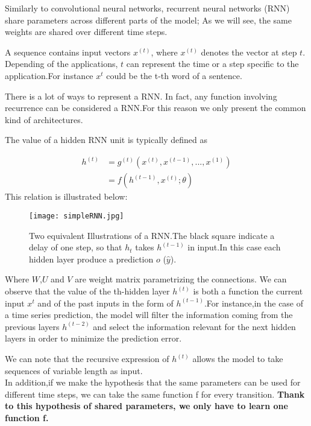\documentclass[11pt, onecolumn, a4paper]{report}
\begin{document}
Similarly to convolutional neural networks, recurrent neural networks (RNN) share parameters across different parts of the model; As we will see, the same weights are shared over different time steps.


A sequence contains input vectors $x^(t)$, where $x^(t)$ denotes the vector at step $t$. Depending of the applications, $t$ can represent the time or a step specific to the application.For instance $x^t$ could be the t-th word of a sentence. 


There is a lot of ways to represent a RNN. In fact, any function involving recurrence can be considered a RNN.For this reason we only present the common kind of architectures.

The value of a hidden RNN unit is typically defined as

\begin{align}
h^{(t)}  & = g^{(t)}(x^{(t)},x^{(t-1)},...,x^{(1)})\\
& = f(h^{(t-1)},x^{(t)};\theta)
\end{align}
This relation is illustrated below:

\begin{figure}[H]
\texttt{[image: simpleRNN.jpg]}
\caption{Two equivalent Illustrations\cite{Goodfellow-et-al-2016} of a RNN.The black square indicate a delay of one step, so that $h_t$ takes $h^{(t-1)}$ in input.In this case each hidden layer produce a prediction $o$ ($\hat{y}$). }
\end{figure}

Where $W$,$U$ and $V$ are weight matrix parametrizing the connections.
We can observe that the value of the th-hidden layer $h^{(t)}$ is both a function the current input $x^t$ and of the past inputs in the form of $h^{(t-1)}$.For instance,in the case of a time series prediction, the model will filter the information coming from the previous layers $h^{(t-2)}$ and select the information relevant for the next hidden layers in order to minimize the prediction error.

We can note that the recursive expression of $h^{(t)}$ allows the model to take sequences of variable length as input. \\

In addition,if we make the hypothesis that the same parameters can be used for different time steps, we can take the same function f for every transition. \textbf{Thank to this hypothesis of shared parameters, we only have to learn one function f.}\\
\end{document}
